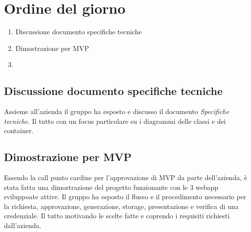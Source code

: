 \section{Ordine del giorno}
\begin{enumerate}
\item Discussione documento specifiche tecniche
\item Dimostrazione per MVP
\item 
\end{enumerate}

\subsection{Discussione documento specifiche tecniche} 
Assieme all'azienda il gruppo ha esposto e discusso il documento \textit{Specifiche tecniche}. Il tutto con un focus particolare su i diagrammi delle classi e dei container.
\subsection{Dimostrazione per MVP}
Essendo la call punto cardine per l'approvazione di MVP da parte dell'azienda, è stata fatta una dimostrazione del progetto funzionante con le 3 webapp sviluppoate attive. Il gruppo ha esposto il flusso e il procedimento necessario per la richiesta, approvazione, generazione, storage, presentazione e verifica di una credenziale.
Il tutto motivando le scelte fatte e coprendo i requisiti richiesti dall'azienda.

